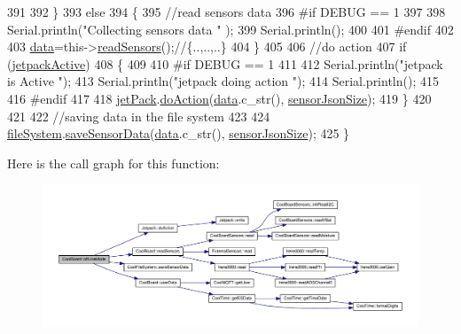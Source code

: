 \begin{DoxyCode}
391                 
392     \}   
393     \textcolor{keywordflow}{else}
394     \{
395         \textcolor{comment}{//read sensors data}
396 \textcolor{preprocessor}{    #if DEBUG == 1}
397 
398         Serial.println(\textcolor{stringliteral}{"Collecting sensors data "} );
399         Serial.println();
400 
401 \textcolor{preprocessor}{    #endif}
402 
403         \hyperlink{classCoolBoard_a427fb753dd8575bdf821c70a5c63d695}{data}=this->\hyperlink{classCoolBoard_ad03abdce2e65f520bbf2cff0f2d083cf}{readSensors}();\textcolor{comment}{//\{..,..,..\}}
404     \}
405 
406     \textcolor{comment}{//do action}
407     \textcolor{keywordflow}{if} (\hyperlink{classCoolBoard_a9be03a913d26e558328935ca3b59a75e}{jetpackActive})
408     \{
409 
410 \textcolor{preprocessor}{    #if DEBUG == 1}
411 
412         Serial.println(\textcolor{stringliteral}{"jetpack is Active "});
413         Serial.println(\textcolor{stringliteral}{"jetpack doing action "});
414         Serial.println();
415     
416 \textcolor{preprocessor}{    #endif}
417 
418         \hyperlink{classCoolBoard_a30b1357881b01ccbec676856a91e48e9}{jetPack}.\hyperlink{classJetpack_a86d2e83436ef4b85f4c3a6e85ac785b0}{doAction}(\hyperlink{classCoolBoard_a427fb753dd8575bdf821c70a5c63d695}{data}.c\_str(), \hyperlink{classCoolBoard_a58e4b6072e3ac8b141ec0befb479208e}{sensorJsonSize});
419     \}
420     
421     
422     \textcolor{comment}{//saving data in the file system}
423     
424     \hyperlink{classCoolBoard_a42c2586fbb13ff7f06538e9284e8538d}{fileSystem}.\hyperlink{classCoolFileSystem_a4c560c2ddd40b74b7758e6ceb2c58957}{saveSensorData}(\hyperlink{classCoolBoard_a427fb753dd8575bdf821c70a5c63d695}{data}.c\_str(), 
      \hyperlink{classCoolBoard_a58e4b6072e3ac8b141ec0befb479208e}{sensorJsonSize});
425 \}
\end{DoxyCode}
Here is the call graph for this function\+:
\nopagebreak
\begin{figure}[H]
\begin{center}
\leavevmode
\includegraphics[width=350pt]{classCoolBoard_ae6b5e1274d760462290192acea4adca8_cgraph}
\end{center}
\end{figure}
\mbox{\label{classCoolBoard_aa0bbc4bc605e35618d18e68795c61363}} 

